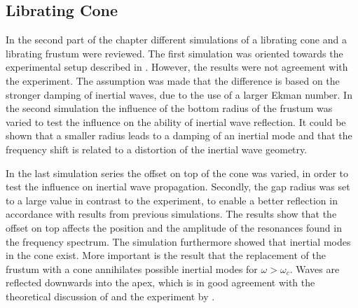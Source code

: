 \subsection{Librating Cone}

In the second part of the chapter different simulations of
a librating cone and a librating frustum were reviewed.
The first simulation was oriented towards the experimental setup described in \citep{Beardsley1970}.
However, the results  were not agreement with the experiment.
The assumption was made that the difference is based on the  stronger damping of inertial waves,
due to the use of a larger Ekman number.
In the second simulation the influence of the bottom radius of the frustum was varied
to test the influence on the ability of inertial wave reflection.
It could be shown that a smaller radius leads to a damping of an inertial mode and that the frequency
shift is related to a distortion of the inertial wave geometry.

In the last simulation series  the offset on top of the cone was varied, in order to test the influence on
inertial wave propagation. Secondly, the gap radius was set to a large value in contrast to the experiment,
to enable a better reflection in accordance with results from previous simulations.
The results  show that the offset on top affects the position and the amplitude of the resonances
found in the frequency spectrum.
The simulation furthermore showed that inertial modes in the cone exist.
More important is the result that the replacement of the frustum with a cone annihilates possible
inertial modes for $\omega > \omega_c$.
Waves are reflected downwards into the apex, which is in good agreement with the
theoretical discussion of \citep{Greenspan1969} and the experiment by \citep{Beardsley1970}.

